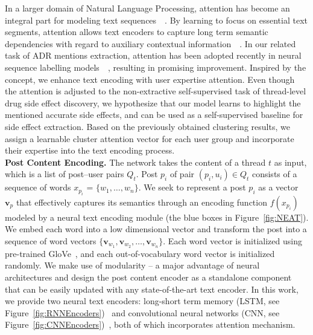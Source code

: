 \documentclass{bmcart}
\begin{document}
In a larger domain of Natural Language Processing, attention has become an integral part for modeling text sequences~\cite{luong2015effective}~\cite{vaswani2017attention}. By learning to focus on essential text segments, attention allows text encoders to capture long term semantic dependencies with regard to auxiliary contextual information~\cite{chen2016neural}~\cite{feng2019attention}. 
In our related task of ADR mentions extraction, attention has been adopted recently in neural sequence labelling models~\cite{ding2018attentive}~\cite{ramamoorthy2018attentive}, 
resulting in promising improvement. 
Inspired by the concept, we enhance text encoding with user expertise attention. Even though the attention is adjusted to the non-extractive self-supervised task of thread-level drug side effect discovery, we hypothesize that our model learns to highlight the mentioned accurate side effects, and can be used as a self-supervised baseline for side effect extraction. Based on the previously obtained clustering results, we assign a learnable cluster attention vector for each user group and incorporate their expertise into the text encoding process. \\

\textbf{Post Content Encoding.} The network takes the content of a
thread $t$ as input, which is a list of post--user pairs $Q_t$.  Post
$p_i$ of pair $\left(p_i, u_i\right)\in Q_t$ consists of a sequence of words $x_{p_i}$ = $\{w_1, \ldots, w_n\}$.
We seek to represent a post $p_{i}$ as a vector $\boldsymbol{v}_{p}$ 
that effectively captures its semantics through an encoding function $f(x_{p_i})$ modeled by a neural text encoding module (the blue boxes in Figure~\ref{fig:NEAT}). 
We embed each word into a low dimensional vector 
and transform the post into a sequence of word vectors
$\{\boldsymbol{v}_{w_1}, \boldsymbol{v}_{w_2},\ldots,
\boldsymbol{v}_{w_n}\}$. Each word vector is initialized using pre-trained GloVe~\cite{pennington2014glove}, and each out-of-vocabulary word vector is initialized randomly. We make use of modularity -- a major advantage of neural architectures and design the post content encoder as a standalone component that can be easily updated with any state-of-the-art text encoder. In this work, we provide two neural text encoders: 
long-short term memory (LSTM, see Figure~\ref{fig:RNNEncoders})~\cite{hochreiter1997long} 
and convolutional neural networks 
(CNN, see Figure~\ref{fig:CNNEncoders})~\cite{kim2014convolutional}, 
both of which incorporates attention mechanism.
\end{document}
